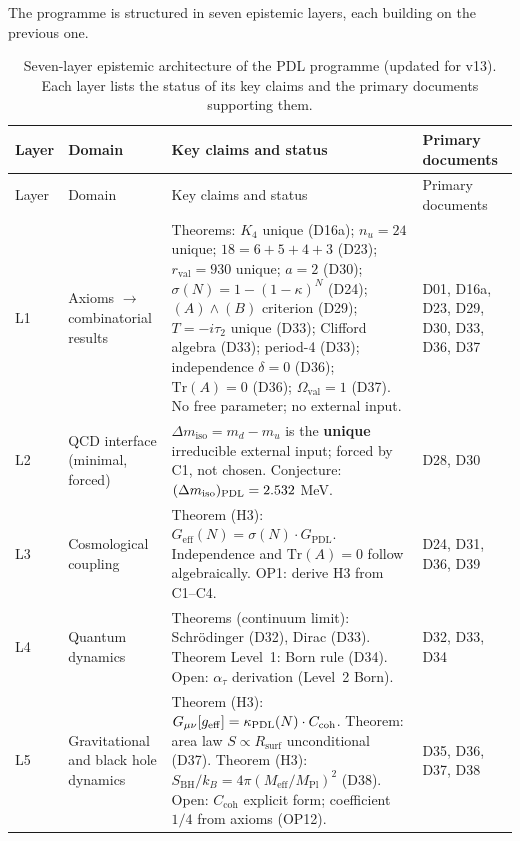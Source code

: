 \documentclass[11pt,a4paper]{article}
\theoremstyle{plain}
\theoremstyle{definition}
\theoremstyle{remark}
\newcommand{\PDL}{\textnormal{PDL}}
\newcommand{\Kfour}{K_4}
\newcommand{\Geff}{G_{\mathrm{eff}}}
\newcommand{\GPDL}{G_{\mathrm{PDL}}}
\newcommand{\rval}{r_{\mathrm{val}}}
\newcommand{\Rsurf}{R_{\mathrm{surf}}}
\newcommand{\sigmaN}{\sigma(N)}
\newcommand{\SBH}{S_{\mathrm{BH}}}
\newcommand{\Meff}{M_{\mathrm{eff}}}
\newcommand{\MPl}{M_{\mathrm{Pl}}}
\begin{document}
The programme is structured in seven epistemic layers, each building on the previous one.

\begin{longtable}{@{}L{0.6cm}L{3.0cm}L{5.5cm}L{4.0cm}@{}}
\caption{Seven-layer epistemic architecture of the PDL programme (updated for v13). Each layer lists the status of its key claims and the primary documents supporting them.}
\label{tab:epistemic}\\
\toprule
Layer & Domain & Key claims and status & Primary documents \\
\midrule
\endfirsthead
\toprule
Layer & Domain & Key claims and status & Primary documents \\
\midrule
\endhead
\bottomrule
\endfoot

L1 & Axioms $\to$ combinatorial results &
\textcolor{proofblue}{Theorems}: $\Kfour$ unique (D16a); $n_u=24$ unique; $18=6+5+4+3$ (D23); $\rval=930$ unique; $a=2$ (D30); $\sigma(N)=1-(1-\kappa)^N$ (D24); $(A)\wedge(B)$ criterion (D29); $T=-i\tau_2$ unique (D33); Clifford algebra (D33); period-4 (D33); independence $\delta=0$ (D36); $\mathrm{Tr}(A)=0$ (D36); $\Omega_{\mathrm{val}}=1$ (D37).
No free parameter; no external input. &
D01, D16a, D23, D29, D30, D33, D36, D37 \\[0.4em]

L2 & QCD interface (minimal, forced) &
$\Delta m_{\mathrm{iso}} = m_d - m_u$ is the \textbf{unique} irreducible external input; forced by C1, not chosen.
\textcolor{conjecturegreen}{Conjecture}: $(\Delta m_{\mathrm{iso}})_{\PDL}=2.532$ MeV. &
D28, D30 \\[0.4em]

L3 & Cosmological coupling &
\textcolor{proofblue}{Theorem (H3)}: $\Geff(N)=\sigmaN\cdot\GPDL$.
Independence and $\mathrm{Tr}(A)=0$ follow algebraically.
\textcolor{openproblemred}{OP1}: derive H3 from C1--C4. &
D24, D31, D36, D39 \\[0.4em]

L4 & Quantum dynamics &
\textcolor{proofblue}{Theorems} (continuum limit): Schr\"odinger (D32), Dirac (D33).
\textcolor{proofblue}{Theorem Level~1}: Born rule (D34).
\textcolor{openproblemred}{Open}: $\alpha_\tau$ derivation (Level~2 Born). &
D32, D33, D34 \\[0.4em]

L5 & Gravitational and black hole dynamics &
\textcolor{proofblue}{Theorem (H3)}: $G_{\mu\nu}[g_{\mathrm{eff}}]=\kappa_{\PDL}(N)\cdot C_{\mathrm{coh}}$.
\textcolor{proofblue}{Theorem}: area law $S\propto\Rsurf$ unconditional (D37).
\textcolor{proofblue}{Theorem (H3)}: $\SBH/k_B=4\pi(\Meff/\MPl)^2$ (D38).
\textcolor{openproblemred}{Open}: $C_{\mathrm{coh}}$ explicit form; coefficient $1/4$ from axioms (OP12). &
D35, D36, D37, D38 \\[0.4em]


\end{longtable}
\end{document}
